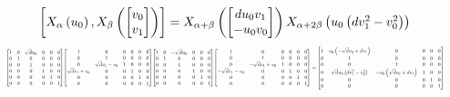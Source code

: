 \documentclass[11pt]{article}
\theoremstyle{definition}
\begin{document}
\[
\scaletoalign{\textwidth}{\left[ X_{\alpha}\left(u_{0}\right), X_{\beta}\left(\left[\begin{matrix}v_{0}\\v_{1}\end{matrix}\right]\right) \right] = X_{\alpha + \beta}\left(\left[\begin{matrix}d u_{0} v_{1}\\- u_{0} v_{0}\end{matrix}\right]\right) X_{\alpha + 2\beta}\left(u_{0} \left(d v_{1}^{2} - v_{0}^{2}\right)\right)}
\]
\[
\scaletoalign{\textwidth}{{\left[\begin{matrix}1 & 0 & \sqrt{d} u_{0} & 0 & 0 & 0\\0 & 1 & 0 & 0 & 0 & 0\\0 & 0 & 1 & 0 & 0 & 0\\0 & 0 & 0 & 1 & 0 & 0\\0 & 0 & 0 & 0 & 1 & 0\\0 & 0 & 0 & 0 & 0 & 1\end{matrix}\right]} {\left[\begin{matrix}1 & 0 & 0 & 0 & 0 & 0\\0 & 1 & 0 & 0 & 0 & 0\\0 & \sqrt{d} v_{1} - v_{0} & 1 & 0 & 0 & 0\\\sqrt{d} v_{1} + v_{0} & 0 & 0 & 1 & 0 & 0\\0 & 0 & 0 & 0 & 1 & 0\\0 & 0 & 0 & 0 & 0 & 1\end{matrix}\right]} {\left[\begin{matrix}1 & 0 & - \sqrt{d} u_{0} & 0 & 0 & 0\\0 & 1 & 0 & 0 & 0 & 0\\0 & 0 & 1 & 0 & 0 & 0\\0 & 0 & 0 & 1 & 0 & 0\\0 & 0 & 0 & 0 & 1 & 0\\0 & 0 & 0 & 0 & 0 & 1\end{matrix}\right]} {\left[\begin{matrix}1 & 0 & 0 & 0 & 0 & 0\\0 & 1 & 0 & 0 & 0 & 0\\0 & - \sqrt{d} v_{1} + v_{0} & 1 & 0 & 0 & 0\\- \sqrt{d} v_{1} - v_{0} & 0 & 0 & 1 & 0 & 0\\0 & 0 & 0 & 0 & 1 & 0\\0 & 0 & 0 & 0 & 0 & 1\end{matrix}\right]} = {\left[\begin{matrix}1 & u_{0} \left(- \sqrt{d} v_{0} + d v_{1}\right) & 0 & 0 & 0 & 0\\0 & 1 & 0 & 0 & 0 & 0\\0 & 0 & 1 & 0 & 0 & 0\\0 & \sqrt{d} u_{0} \left(d v_{1}^{2} - v_{0}^{2}\right) & - u_{0} \left(\sqrt{d} v_{0} + d v_{1}\right) & 1 & 0 & 0\\0 & 0 & 0 & 0 & 1 & 0\\0 & 0 & 0 & 0 & 0 & 1\end{matrix}\right]}}
\]
\end{document}
